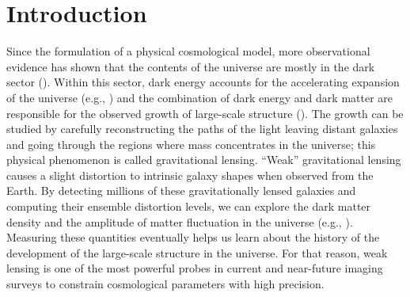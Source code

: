 \documentclass[fleqn,usenatbib]{mnras}
\begin{document}


\section{Introduction}

Since the formulation of a physical cosmological model, more observational evidence has shown that the contents of the universe are mostly in the dark sector (\citealt{2020A&A...633A..69H, 2018PhRvD..98d3528T, 2019PhRvL.122q1301A, 2019PASJ...71...43H, 2021A&A...645A.104A}). Within this sector, dark energy accounts for the accelerating expansion of the universe (e.g., \citealt{1998AJ....116.1009R, 1999AIPC..478..129P}) and the combination of dark energy and dark matter are responsible for the observed growth of large-scale structure (\citealt{2015RPPh...78h6901K, 2017grle.book.....D}). The growth can be studied by carefully reconstructing the paths of the light leaving distant galaxies and going through the regions where mass concentrates in the universe; this physical phenomenon is called gravitational lensing. “Weak” gravitational lensing causes a slight distortion to intrinsic galaxy shapes when observed from the Earth. By detecting millions of these gravitationally lensed galaxies and computing their ensemble distortion levels, we can explore the dark matter density and the amplitude of matter fluctuation in the universe (e.g., \citealt{2001PhR...340..291B}). Measuring these quantities eventually helps us learn about the history of the development of the large-scale structure in the universe. For that reason, weak lensing is one of the most powerful probes in current and near-future imaging surveys to constrain cosmological parameters with high precision. 
\end{document}
